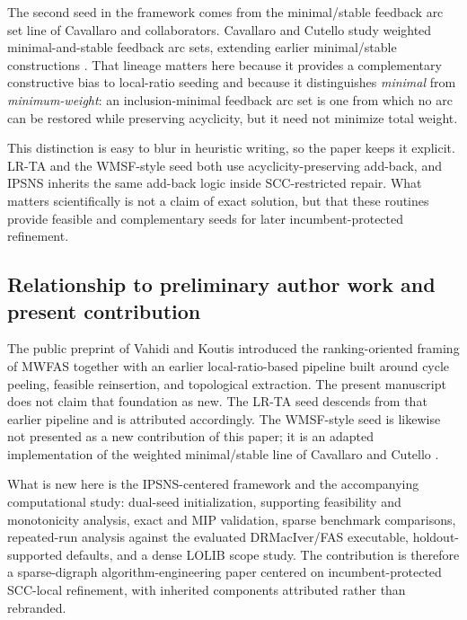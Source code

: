 The second seed in the framework comes from the minimal/stable feedback arc set line of Cavallaro and collaborators. Cavallaro and Cutello \cite{CC25} study weighted minimal-and-stable feedback arc sets, extending earlier minimal/stable constructions \cite{CCP24}. That lineage matters here because it provides a complementary constructive bias to local-ratio seeding and because it distinguishes \emph{minimal} from \emph{minimum-weight}: an inclusion-minimal feedback arc set is one from which no arc can be restored while preserving acyclicity, but it need not minimize total weight.

This distinction is easy to blur in heuristic writing, so the paper keeps it explicit. LR-TA and the WMSF-style seed both use acyclicity-preserving add-back, and IPSNS inherits the same add-back logic inside SCC-restricted repair. What matters scientifically is not a claim of exact solution, but that these routines provide feasible and complementary seeds for later incumbent-protected refinement.

\subsection{Relationship to preliminary author work and present contribution}
\label{subsec:prior-work}

The public preprint of Vahidi and Koutis \cite{VahidiKoutis2024arxiv} introduced the ranking-oriented framing of MWFAS together with an earlier local-ratio-based pipeline built around cycle peeling, feasible reinsertion, and topological extraction. The present manuscript does not claim that foundation as new. The LR-TA seed descends from that earlier pipeline and is attributed accordingly. The WMSF-style seed is likewise not presented as a new contribution of this paper; it is an adapted implementation of the weighted minimal/stable line of Cavallaro and Cutello \cite{CC25}.

What is new here is the IPSNS-centered framework and the accompanying computational study: dual-seed initialization, supporting feasibility and monotonicity analysis, exact and MIP validation, sparse benchmark comparisons, repeated-run analysis against the evaluated DRMacIver/FAS executable, holdout-supported defaults, and a dense LOLIB scope study. The contribution is therefore a sparse-digraph algorithm-engineering paper centered on incumbent-protected SCC-local refinement, with inherited components attributed rather than rebranded.
